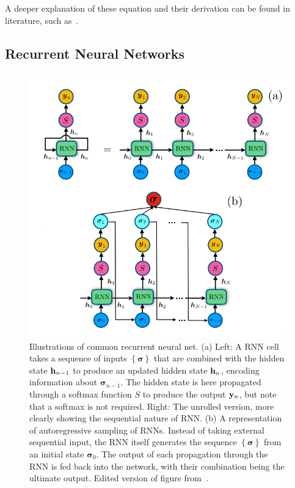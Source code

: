 A deeper explanation of these equation and their derivation can be found in
literature, such as~\cite{mehta}.

\subsection{Recurrent Neural Networks}

\begin{figure}[ht]
  \centering
  \includegraphics[width=\columnwidth]{figures/rnn.png}
  \caption{\label{fig:rnn} Illustrations of common recurrent neural net. (a)
    Left: A RNN cell takes a sequence of inputs \(\left\{  \mathbf{\sigma}\right\}\) that are
    combined with the hidden state \(\vb{h}_{n-1}\) to produce an updated hidden
    state \(\vb{h}_{n}\), encoding information about \(\mathbf{\sigma}_{n-1}\).
    The hidden state is here propagated through a softmax function \(S\) to
    produce the output \(\vb{y}_{n}\), but note that a softmax is not required.
    Right: The unrolled version, more clearly showing the sequential nature of
    RNN. (b) A representation of autoregressive sampling of RNNs. Instead of
    taking external sequential input, the RNN itself generates the sequence
    \(\left\{ \mathbf{\sigma} \right\}\) from an initial state
    \(\mathbf{\sigma}_{0}\). The output of each propagation through the RNN is
    fed back into the network, with their combination being the ultimate output.
    Edited
    version of figure from~\cite{hibatallah2020recurrent}.}
\end{figure}

